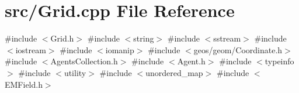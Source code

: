 \section{src/\+Grid.cpp File Reference}
\label{_grid_8cpp}
{\ttfamily \#include $<$Grid.\+h$>$}\newline
{\ttfamily \#include $<$string$>$}\newline
{\ttfamily \#include $<$sstream$>$}\newline
{\ttfamily \#include $<$iostream$>$}\newline
{\ttfamily \#include $<$iomanip$>$}\newline
{\ttfamily \#include $<$geos/geom/\+Coordinate.\+h$>$}\newline
{\ttfamily \#include $<$Agents\+Collection.\+h$>$}\newline
{\ttfamily \#include $<$Agent.\+h$>$}\newline
{\ttfamily \#include $<$typeinfo$>$}\newline
{\ttfamily \#include $<$utility$>$}\newline
{\ttfamily \#include $<$unordered\+\_\+map$>$}\newline
{\ttfamily \#include $<$E\+M\+Field.\+h$>$}\newline
